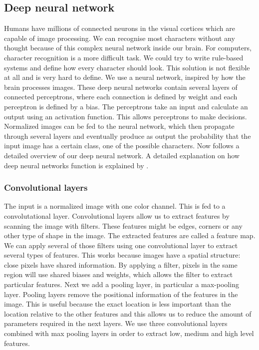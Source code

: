 \documentclass{article}
\begin{document}
\subsection{Deep neural network}
\label{sec:dnn}
Humans have millions of connected neurons in the visual cortices which are capable of image processing.
We can recognise most characters without any thought because of this complex neural network inside our brain. 
For computers, character recognition is a more difficult task. We could try to write rule-based systems and define how every character should look. This solution is not flexible at all and is very hard to define.
We use a neural network, inspired by how the brain processes images. These deep neural networks contain several layers of connected perceptrons, where each connection is defined by weight and each perceptron is defined by a bias. 
The perceptrons take an input and calculate an output using an activation function. This allows perceptrons to make decisions.  
Normalized images can be fed to the neural network, which then propagate through several layers and eventually produce as output the probability that the input image has a certain class, one of the possible characters. 
Now follows a detailed overview of our deep neural network. A detailed explanation on how deep neural networks function is explained by \cite{nnbook}.

\subsubsection{Convolutional layers}
 The input is a normalized image with one color channel. This is fed to a convolutational layer. Convolutional layers allow us to extract features by scanning the image with filters. These features might be edges, corners or any other type of shape in the image. The extracted features are called a feature map. 
 We can apply several of those filters using one convolutional layer to extract several types of features. 
 This works because images have a spatial structure: close pixels have shared information. By applying a filter, pixels in the same region will use shared biases and weights, which allows the filter to extract particular features. 
 Next we add a pooling layer, in particular a max-pooling layer. Pooling layers remove the positional information of the features in the image. This is useful because the exact location is less important than the location relative to the other features and this allows us to reduce the amount of parameters required in the next layers. 
We use three convolutional layers combined with max pooling layers in order to extract low, medium and high level features. 
\end{document}
